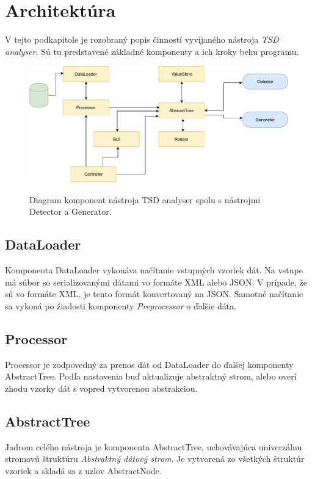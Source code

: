 \section{Architektúra}
V tejto podkapitole je rozobraný popis činností vyvíjaného nástroja \textit{TSD analyser}. Sú tu predstavené základné komponenty a ich kroky behu programu. 
\begin{figure}[h]\centering
	\centering
	\includegraphics[width=6.0in,keepaspectratio]{obrazky-figures/architecture.pdf}\\[1pt]
	\caption{Diagram komponent nástroja TSD analyser spolu s nástrojmi Detector a Generator.}
	\label{architecture_img}
\end{figure} 
\subsection*{DataLoader}
Komponenta DataLoader vykonáva načítanie vstupných vzoriek dát. Na vstupe má súbor so serializovanými dátami vo formáte XML alebo JSON. V prípade, že sú vo formáte XML, je tento formát konvertovaný na JSON. Samotné načítanie sa vykoná po žiadosti komponenty \textit{Preprocessor} o ďalšie dáta. 
\subsection*{Processor}
Processor je zodpovedný za prenos dát od DataLoader do ďalšej komponenty AbstractTree. Podľa nastavenia buď aktualizuje abstraktný strom, alebo overí zhodu vzorky dát s vopred vytvorenou abstrakciou. 
\subsection*{AbstractTree}
Jadrom celého nástroja je komponenta AbstractTree, uchovávajúca univerzálnu stromovú štruktúru \textit{Abstraktný dátový strom}. Je vytvorená zo všetkých štruktúr vzoriek a skladá sa z uzlov AbstractNode.   
